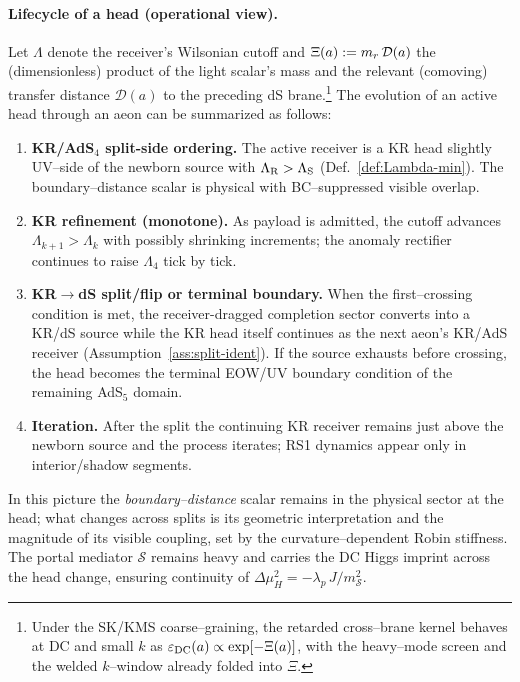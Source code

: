\documentclass[10pt]{article}
\theoremstyle{definition}
\theoremstyle{plain}
\begin{document}
\paragraph{Lifecycle of a head (operational view).}\label{par:uom-main-100}
Let \(\Lambda\) denote the receiver’s Wilsonian cutoff and \(\Xi(a):=m_r\,{\cal D}(a)\) the (dimensionless)
product of the light scalar’s mass and the relevant (comoving) transfer distance \(\mathcal D(a)\) to the
preceding dS brane.\footnote{Under the SK/KMS coarse--graining, the retarded cross--brane kernel behaves at DC
and small $k$ as \(\varepsilon_{\rm DC}(a)\propto \exp[-\Xi(a)]\), with the heavy--mode screen and the welded
$k$--window already folded into \(\Xi\).} The evolution of an active head through an aeon can be summarized as follows:

\begin{enumerate}[leftmargin=2.4em]
\item \textbf{KR/AdS$_4$ split-side ordering.} The active receiver is a KR head slightly UV--side of the
newborn source with $\Lambda_{\rm R}>\Lambda_{\rm S}$ (Def.~\ref{def:Lambda-min}). The boundary--distance scalar
is physical with BC--suppressed visible overlap.

\item \textbf{KR refinement (monotone).} As payload is admitted, the cutoff advances
$\Lambda_{k+1}>\Lambda_k$ with possibly shrinking increments; the anomaly rectifier continues to raise
$\Lambda_4$ tick by tick.

\item \textbf{KR$\to$dS split/flip or terminal boundary.} When the first--crossing condition is met, the
receiver-dragged completion sector converts into a KR/dS source while the KR head itself continues as the
next aeon's KR/AdS receiver (Assumption~\ref{ass:split-ident}). If the source exhausts before crossing, the head
becomes the terminal EOW/UV boundary condition of the remaining AdS$_5$ domain.

\item \textbf{Iteration.} After the split the continuing KR receiver remains just above the newborn source
and the process iterates; RS1 dynamics appear only in interior/shadow segments.
\end{enumerate}

\noindent In this picture the \emph{boundary--distance} scalar remains in the physical sector at the head;
what changes across splits is its geometric interpretation and the magnitude of its visible coupling, set
by the curvature--dependent Robin stiffness. The portal mediator \(\mathcal S\) remains heavy and carries the
DC Higgs imprint across the head change, ensuring continuity of \(\Delta\mu_H^2=-\lambda_p\,J/m_{\mathcal S}^2\).
\end{document}
